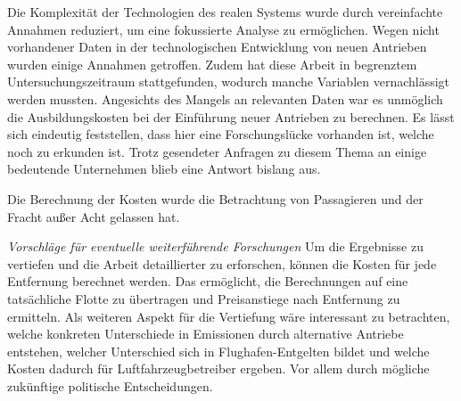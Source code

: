 Die Komplexität der Technologien des realen Systems wurde durch vereinfachte Annahmen reduziert, 
um eine fokussierte Analyse zu ermöglichen. 
Wegen nicht vorhandener Daten in der technologischen Entwicklung von neuen Antrieben wurden einige Annahmen getroffen.
Zudem hat diese Arbeit in begrenztem Untersuchungszeitraum stattgefunden, 
wodurch manche Variablen vernachlässigt werden mussten.
%
Angesichts des Mangels an relevanten Daten war es unmöglich die Ausbildungskosten bei der Einführung neuer Antrieben zu berechnen.
Es lässt sich eindeutig feststellen, dass hier eine Forschungslücke vorhanden ist, welche noch zu erkunden ist.
Trotz gesendeter Anfragen zu diesem Thema an einige bedeutende Unternehmen blieb eine Antwort bislang aus.

Die Berechnung der Kosten wurde die Betrachtung von Passagieren und der Fracht außer Acht gelassen hat. 

\textit{Vorschläge für eventuelle weiterführende Forschungen}
Um die Ergebnisse zu vertiefen und die Arbeit detaillierter zu erforschen, können die Kosten für jede Entfernung berechnet werden.
Das ermöglicht, die Berechnungen auf eine tatsächliche Flotte zu übertragen und Preisanstiege nach Entfernung zu ermitteln.
Als weiteren Aspekt für die Vertiefung wäre interessant zu betrachten, welche konkreten Unterschiede in Emissionen durch 
alternative Antriebe entstehen, welcher Unterschied sich in Flughafen-Entgelten bildet und welche Kosten dadurch
für Luftfahrzeugbetreiber ergeben. Vor allem durch mögliche zukünftige politische Entscheidungen.


